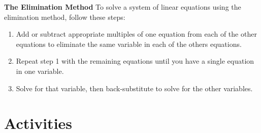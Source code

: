\documentclass{article}
\theoremstyle{definition}
\newcounter{calloutbox}
\begin{document}
\begin{calloutbox}\label{box:elimination-method}
    \textbf{The Elimination Method} To solve a system of linear equations using the elimination method, follow these steps:
    \begin{enumerate}
        \item Add or subtract appropriate multiples of one equation from each of the other equations to eliminate the same variable in each of the others equations.
        \item Repeat step 1 with the remaining equations until you have a single equation in one variable.
        \item Solve for that variable, then back-substitute to solve for the other variables.
    \end{enumerate}
\end{calloutbox}

\section{Activities}\label{sec-activities}
\end{document}

